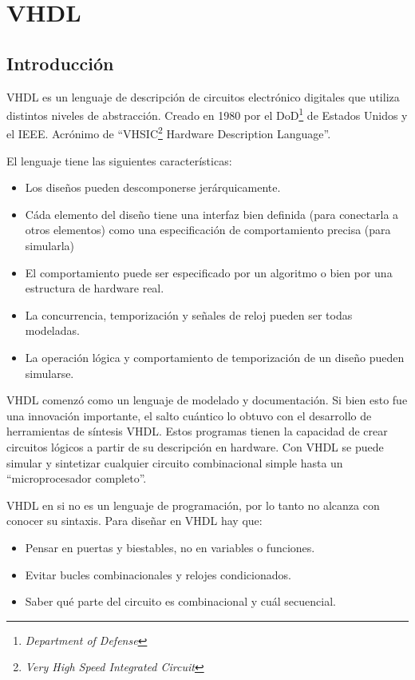 \section{VHDL}
\subsection{Introducción}
VHDL es un lenguaje de descripción de circuitos electrónico digitales que utiliza distintos niveles de abstracción. Creado en 1980 por 
el DoD\footnote{\textit{Department of Defense}} de Estados Unidos y el IEEE. Acrónimo de ``VHSIC\footnote{\textit{Very High Speed 
Integrated Circuit}} Hardware Description Language''.

El lenguaje tiene las siguientes características:
\begin{itemize}
 \item Los diseños pueden descomponerse jerárquicamente.
 \item Cáda elemento del diseño tiene una interfaz bien definida (para conectarla a otros elementos) como una especificación de 
comportamiento precisa (para simularla)
 \item El comportamiento puede ser especificado por un algoritmo o bien por una estructura de hardware real.
 \item La concurrencia, temporización y señales de reloj pueden ser todas modeladas.
 \item La operación lógica y comportamiento de temporización de un diseño pueden simularse.
\end{itemize}

VHDL comenzó como un lenguaje de modelado y documentación. Si bien esto fue una innovación importante, el salto cuántico lo obtuvo con 
el desarrollo de herramientas de síntesis VHDL. Estos programas tienen la capacidad de crear circuitos lógicos a partir de su descripción
en hardware. Con VHDL se puede simular y sintetizar cualquier circuito combinacional simple hasta un ``microprocesador completo''.

VHDL en si no es un lenguaje de programación, por lo tanto no alcanza con conocer su sintaxis. Para diseñar en VHDL hay que:
\begin{itemize}
 \item Pensar en puertas y biestables, no en variables o funciones.
 \item Evitar bucles combinacionales y relojes condicionados.
 \item Saber qué parte del circuito es combinacional y cuál secuencial.
\end{itemize}

